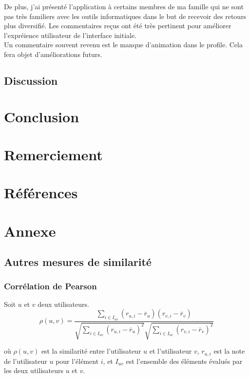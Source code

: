 \documentclass[11pt]{article}
\begin{document}
De plus, j'ai présenté l'application à certains membres de ma famille qui ne sont pas très familiers avec les outils informatiques dans le but de recevoir des retours plus diversifié. Les commentaires reçus ont été très pertinent pour améliorer l'expréience utilisateur de l'interface initiale.\\

Un commentaire souvent revenu est le manque d'animation dans le profile. Cela fera objet d'améliorations futurs.

\subsection{Discussion}

\newpage
\section{Conclusion}

\newpage
\section{Remerciement}

\newpage
\section{Références}

\newpage
\section{Annexe}
\subsection{Autres mesures de similarité}
\subsubsection{Corrélation de Pearson}
Soit $u$ et $v$ deux utilisateurs. 
\begin{equation}
\rho(u, v) = \frac{\sum_{i \in I_{uv}} (r_{u,i} - \overline{r}_u)(r_{v,i} - \overline{r}_v)}{\sqrt{\sum_{i \in I_{uv}} (r_{u,i} - \overline{r}_u)^2}\sqrt{\sum_{i \in I_{uv}} (r_{v,i} - \overline{r}_v)^2}}
\end{equation}

où $\rho(u, v)$ est la similarité entre l'utilisateur $u$ et l'utilisateur $v$, $r_{u,i}$ est la note de l'utilisateur $u$ pour l'élément $i$, et $I_{uv}$ est l'ensemble des éléments évalués par les deux utilisateurs $u$ et $v$.
\end{document}
